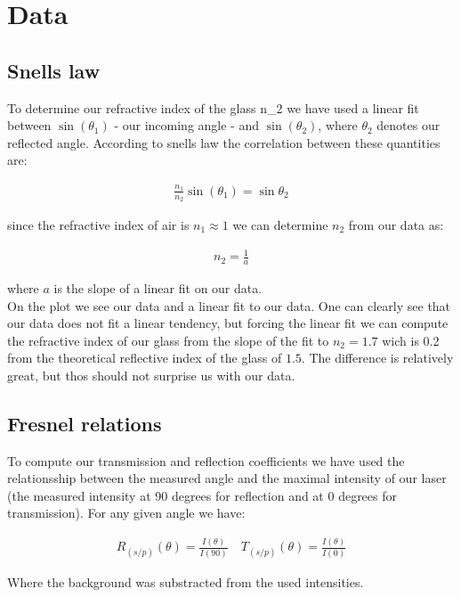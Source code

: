 \section{Data}

\subsection{Snells law}

To determine our refractive index of the glass {n_2} we have used a linear fit between $\sin(\theta_1)$ - our incoming angle - and $\sin(\theta_2)$, where $\theta_2$ denotes our reflected angle. According to snells law the correlation between these quantities are:

\begin{align}
\frac{n_1}{n_2}\sin(\theta_1)=\sin{\theta_2}
\end{align}

since the refractive index of air is $n_1 \approx 1$ we can determine $n_2$ from our data as:

\begin{align}
n_2=\frac{1}{a}
\end{align}

where $a$ is the slope of a linear fit on our data. \\

On the plot we see our data and a linear fit to our data. One can clearly see that our data does not fit a linear tendency, but forcing the linear fit we can compute the refractive index of our glass from the slope of the fit to $n_2=1.7$ wich is 0.2 from the theoretical reflective index of the glass of $1.5$. The difference is relatively great, but thos should not surprise us with our data. 

\subsection{Fresnel relations}

To compute our transmission and reflection coefficients we have used the relationsship between the measured angle and the maximal intensity of our laser (the measured intensity at 90 degrees for reflection and at 0 degrees for transmission). For any given angle we have:

\begin{align}
R_(s/p)(\theta)=\frac{I(\theta)}{I(90)} \quad T_(s/p)(\theta)=\frac{I(\theta)}{I(0)}
\end{align}

Where the background was substracted from the used intensities. 

